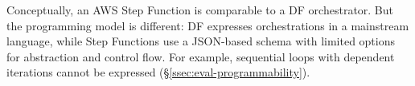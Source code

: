 Conceptually, an AWS Step Function is comparable to a DF orchestrator. But the programming model is different: DF expresses orchestrations in a mainstream language, while Step Functions use a JSON-based schema with limited options for abstraction and control flow. For example, sequential loops with dependent iterations cannot be expressed (\S\ref{ssec:eval-programmability}).

